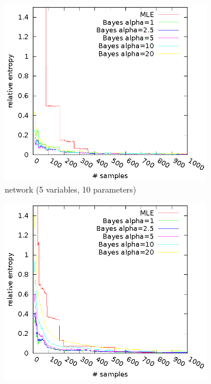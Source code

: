 \documentclass[english,cover]{fitthesis} %
\begin{document}
\begin{figure}[ht]
    \begin{subfigure}[b]{0.5\linewidth}
        \hspace{-2.6cm}\includegraphics[scale=0.95]{fig/kl-cancer}
        \caption{ network (5 variables, 10 parameters)}
    \end{subfigure}
    \quad
    \begin{subfigure}[b]{0.48\linewidth}
        \hspace{-2.4cm}\includegraphics[scale=0.95]{fig/kl-asia}

\end{subfigure}
\end{figure}
\end{document}
